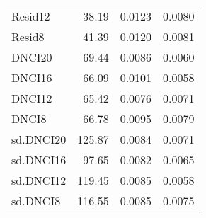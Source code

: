 \begin{longtable}{l|rrr}
Resid12 & 38.19 & 0.0123 & 0.0080 \\ 
Resid8 & 41.39 & 0.0120 & 0.0081 \\ 
DNCI20 & 69.44 & 0.0086 & 0.0060 \\ 
DNCI16 & 66.09 & 0.0101 & 0.0058 \\ 
DNCI12 & 65.42 & 0.0076 & 0.0071 \\ 
DNCI8 & 66.78 & 0.0095 & 0.0079 \\ 
sd.DNCI20 & 125.87 & 0.0084 & 0.0071 \\ 
sd.DNCI16 & 97.65 & 0.0082 & 0.0065 \\ 
sd.DNCI12 & 119.45 & 0.0085 & 0.0058 \\ 
sd.DNCI8 & 116.55 & 0.0085 & 0.0075 \\ 
\bottomrule
\end{longtable}

